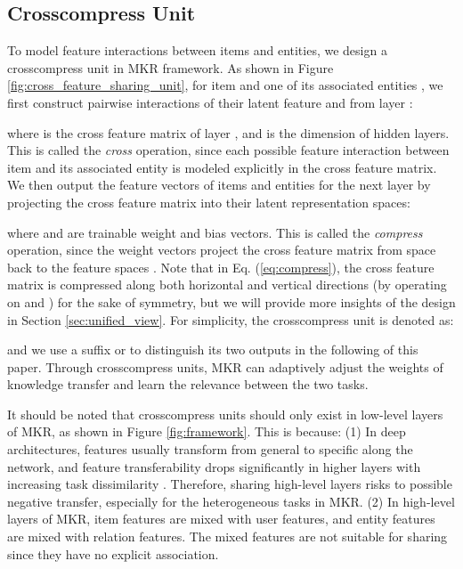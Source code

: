 \documentclass[sigconf]{acmart}
\begin{document}
	
	\subsection{Crosscompress Unit}
To model feature interactions between items and entities, we design a crosscompress unit in MKR framework.
		As shown in Figure \ref{fig:cross_feature_sharing_unit}, for item  and one of its associated entities , we first construct  pairwise interactions of their latent feature  and  from layer :
		
		where  is the cross feature matrix of layer , and  is the dimension of hidden layers.
		This is called the \textit{cross} operation, since each possible feature interaction  between item  and its associated entity  is modeled explicitly in the cross feature matrix.
		We then output the feature vectors of items and entities for the next layer by projecting the cross feature matrix into their latent representation spaces:
		
		where  and  are trainable weight and bias vectors.
		This is called the \textit{compress} operation, since the weight vectors project the cross feature matrix from  space back to the feature spaces .
		Note that in Eq. (\ref{eq:compress}), the cross feature matrix is compressed along both horizontal and vertical directions (by operating on  and ) for the sake of symmetry, but we will provide more insights of the design in Section \ref{sec:unified_view}.
		For simplicity, the crosscompress unit is denoted as:
		
		and we use a suffix  or  to distinguish its two outputs in the following of this paper.
		Through crosscompress units, MKR can adaptively adjust the weights of knowledge transfer and learn the relevance between the two tasks.
		
		It should be noted that crosscompress units should only exist in low-level layers of MKR, as shown in Figure \ref{fig:framework}.
		This is because:
		(1) In deep architectures, features usually transform from general to specific along the network, and feature transferability drops significantly in higher layers with increasing task dissimilarity \cite{yosinski2014transferable}.
		Therefore, sharing high-level layers risks to possible negative transfer, especially for the heterogeneous tasks in MKR.
		(2) In high-level layers of MKR, item features are mixed with user features, and entity features are mixed with relation features.
		The mixed features are not suitable for sharing since they have no explicit association.
		
\end{document}
